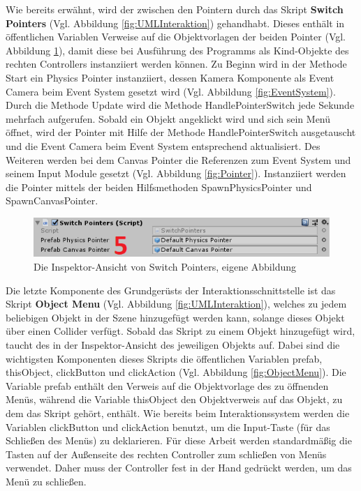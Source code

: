 \newline
Wie bereits erwähnt, wird der zwischen den Pointern durch das Skript \textbf{Switch Pointers} (Vgl. Abbildung \ref{fig:UMLInteraktion}) gehandhabt. Dieses enthält in öffentlichen Variablen Verweise auf die Objektvorlagen der beiden Pointer (Vgl. Abbildung \ref{fig:SwitchPointer}), damit diese bei Ausführung des Programms als Kind-Objekte des rechten Controllers instanziiert werden können.
\newline
Zu Beginn wird in der Methode Start ein Physics Pointer instanziiert, dessen Kamera Komponente als Event Camera beim Event System gesetzt wird (Vgl. Abbildung \ref{fig:EventSystem}). Durch die Methode Update wird die Methode HandlePointerSwitch jede Sekunde mehrfach aufgerufen. Sobald ein Objekt angeklickt wird und sich sein Menü öffnet, wird der Pointer mit Hilfe der Methode HandlePointerSwitch ausgetauscht und die Event Camera beim Event System entsprechend aktualisiert. Des Weiteren werden bei dem Canvas Pointer die Referenzen zum Event System und seinem Input Module gesetzt (Vgl. Abbildung \ref{fig:Pointer}). Instanziiert werden die Pointer mittels der beiden Hilfsmethoden SpawnPhysicsPointer und SpawnCanvasPointer.
\begin{figure}[h]
	\centering
	\includegraphics[width=0.6\linewidth]{Bilder/A45_SwitchPointer2}
	\caption{Die Inspektor-Ansicht von Switch Pointers, eigene Abbildung}
	\label{fig:SwitchPointer}
\end{figure}
\newline
Die letzte Komponente des Grundgerüsts der Interaktionsschnittstelle ist das Skript \textbf{Object Menu} (Vgl. Abbildung \ref{fig:UMLInteraktion}), welches zu jedem beliebigen Objekt in der Szene hinzugefügt werden kann, solange dieses Objekt über einen Collider verfügt. Sobald das Skript zu einem Objekt hinzugefügt wird, taucht des in der Inspektor-Ansicht des jeweiligen Objekts auf. Dabei sind die wichtigsten Komponenten dieses Skripts die öffentlichen Variablen prefab, thisObject, clickButton und clickAction (Vgl. Abbildung \ref{fig:ObjectMenu}). Die Variable prefab enthält den Verweis auf die Objektvorlage des zu öffnenden Menüs, während die Variable thisObject den Objektverweis auf das Objekt, zu dem das Skript gehört, enthält. Wie bereits beim Interaktionssystem werden die Variablen clickButton und clickAction benutzt, um die Input-Taste (für das Schließen des Menüs) zu deklarieren. Für diese Arbeit werden standardmäßig die Tasten auf der Außenseite des rechten Controller zum schließen von Menüs verwendet. Daher muss der Controller fest in der Hand gedrückt werden, um das Menü zu schließen.
